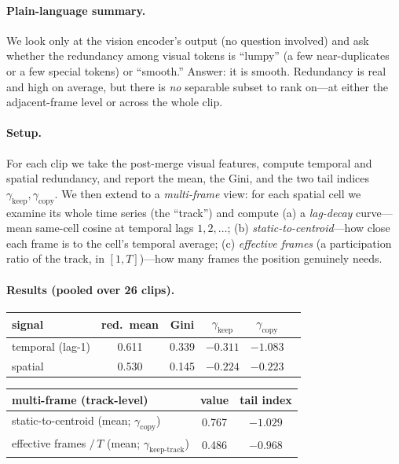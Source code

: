 \documentclass[11pt]{article}
\newcommand{\gkeep}{\gamma_{\mathrm{keep}}}
\newcommand{\gcopy}{\gamma_{\mathrm{copy}}}
\begin{document}
\paragraph{Plain-language summary.}
We look only at the vision encoder's output (no question involved) and ask whether
the redundancy among visual tokens is ``lumpy'' (a few near-duplicates or a few
special tokens) or ``smooth.'' Answer: it is smooth. Redundancy is real and high on
average, but there is \emph{no} separable subset to rank on---at either the
adjacent-frame level or across the whole clip.

\paragraph{Setup.} For each clip we take the post-merge visual features, compute
temporal and spatial redundancy, and report the mean, the Gini, and the two tail
indices $\gkeep,\gcopy$. We then extend to a \emph{multi-frame} view: for each
spatial cell we examine its whole time series (the ``track'') and compute
(a) a \emph{lag-decay} curve---mean same-cell cosine at temporal lags
$1,2,\dots$; (b) \emph{static-to-centroid}---how close each frame is to the cell's
temporal average; (c) \emph{effective frames} (a participation ratio of the track,
in $[1,T]$)---how many frames the position genuinely needs.

\paragraph{Results (pooled over 26 clips).}

\begin{center}
\begin{tabular}{lccccc}
\toprule
signal & red.\ mean & Gini & $\gkeep$ & $\gcopy$ \\
\midrule
temporal (lag-1) & 0.611 & 0.339 & $-0.311$ & $-1.083$ \\
spatial          & 0.530 & 0.145 & $-0.224$ & $-0.223$ \\
\bottomrule
\end{tabular}
\end{center}

\begin{center}
\begin{tabular}{lcc}
\toprule
multi-frame (track-level) & value & tail index \\
\midrule
static-to-centroid (mean; $\gcopy$)        & 0.767 & $-1.029$ \\
effective frames $/\,T$ (mean; $\gamma_{\mathrm{keep\text{-}track}}$) & 0.486 & $-0.968$ \\
\bottomrule
\end{tabular}
\end{center}
\end{document}
